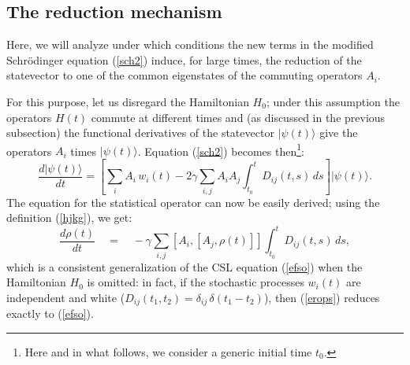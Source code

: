 \documentclass[12pt]{article}
\begin{document}
\subsection{The reduction mechanism} \label{nsec3}

Here, we will analyze under which conditions the new terms in the
modified Schr\"odinger equation (\ref{sch2}) induce, for large
times, the reduction of the statevector to one of the common
eigenstates of the commuting operators $A_{i}$.

For this purpose, let us disregard the Hamiltonian $H_{0}$; under
this assumption the operators $H(t)$ commute at different times
and (as discussed in the previous subsection) the functional
derivatives of the statevector $|\psi(t)\rangle$ give the
operators $A_{i}$ times $|\psi(t)\rangle$. Equation (\ref{sch2})
becomes then\footnote{Here and in what follows, we consider a
generic initial time $t_{0}$.}:
\begin{equation}\label{schred}
\frac{d|\psi(t)\rangle}{dt} =  \left[ \sum_{i} A_{i}\, w_{i}(t) -
2\gamma \sum_{i,j}A_{i} A_{j} \int_{t_{0}}^{t} D_{ij}(t,s)\,ds
\right] |\psi(t)\rangle.
\end{equation}
The equation for the statistical operator can now be easily
derived; using the definition (\ref{hjkg}), we get:
\begin{equation} \label{erops}
\frac{d \rho(t)}{dt} \quad = \quad -\gamma \sum_{i,j} \left[
A_{i}, \left[ A_{j}, \rho(t)\right]\right] \int_{t_{0}}^{t}
D_{ij}(t,s)\, ds,
\end{equation}
which is a consistent generalization of the CSL equation
(\ref{efso}) when the Hamiltonian $H_{0}$ is omitted: in fact, if
the stochastic processes $w_{i}(t)$ are independent and white
($D_{ij}(t_{1}, t_{2}) = \delta_{ij}\, \delta(t_{1} - t_{2})$),
then (\ref{erops}) reduces exactly to (\ref{efso}).
\end{document}
